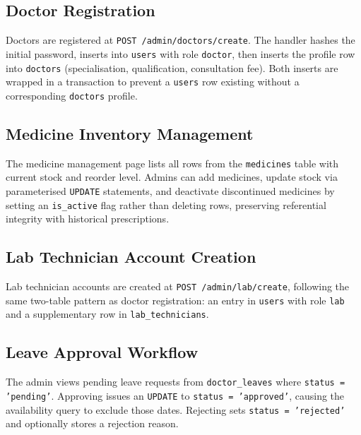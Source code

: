 \subsection{Doctor Registration}
\label{subsec:admin-doctor}

Doctors are registered at \texttt{POST /admin/doctors/create}. The handler hashes the initial password, inserts into \texttt{users} with role \texttt{doctor}, then inserts the profile row into \texttt{doctors} (specialisation, qualification, consultation fee). Both inserts are wrapped in a transaction to prevent a \texttt{users} row existing without a corresponding \texttt{doctors} profile.

\subsection{Medicine Inventory Management}
\label{subsec:medicine}

The medicine management page lists all rows from the \texttt{medicines} table with current stock and reorder level. Admins can add medicines, update stock via parameterised \texttt{UPDATE} statements, and deactivate discontinued medicines by setting an \texttt{is\_active} flag rather than deleting rows, preserving referential integrity with historical prescriptions.

\subsection{Lab Technician Account Creation}
\label{subsec:lab-account}

Lab technician accounts are created at \texttt{POST /admin/lab/create}, following the same two-table pattern as doctor registration: an entry in \texttt{users} with role \texttt{lab} and a supplementary row in \texttt{lab\_technicians}.

\subsection{Leave Approval Workflow}
\label{subsec:leave-approval}

The admin views pending leave requests from \texttt{doctor\_leaves} where \texttt{status = 'pending'}. Approving issues an \texttt{UPDATE} to \texttt{status = 'approved'}, causing the availability query to exclude those dates. Rejecting sets \texttt{status = 'rejected'} and optionally stores a rejection reason.

